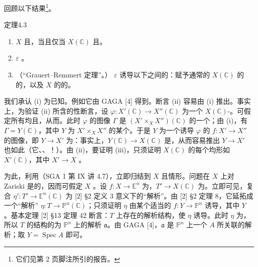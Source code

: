 回顾以下结果\footnote{它们见第 2 页脚注所引的报告。}。
\begin{SGAresult}{定理}{4.3}
\begin{enumerate}
\item[(i)] $X$ 且，当且仅当 $X(\mathbb C)$ 且。
\item[(ii)]  $\varepsilon$ 。
\item[(iii)] （“Grauert--Remmert 定理”。） $\varepsilon$ 诱导以下之间的：赋予通常的 $X(\mathbb C)$ 的的，以及 $X$ 的的。
\end{enumerate}
\end{SGAresult}
我们承认 (i) 为已知。例如它由 GAGA [4] 得到。断言 (ii) 容易由 (i) 推出。事实上，为验证 (ii) 所含的性断言，设 $\varphi:X'(\mathbb C)\to X''(\mathbb C)$ 为一个 $X(\mathbb C)$-。可假定所有均且，从而。此时 $\varphi$ 的图像 $\Gamma$ 是 $(X'\times_X X'')(\mathbb C)$ 的一个；由 (i)，有 $\Gamma=Y(\mathbb C)$，其中 $Y$ 为 $X'\times_X X''$ 的某个。于是 $Y$ 为一个诱导 $\varphi$ 的 $f:X'\to X''$ 的图像，即 $Y\to X'$ 为：事实上，$Y(\mathbb C)\to X(\mathbb C)$ 是，从而容易推出 $Y\to X'$ 也如此（它、、！）。由 (ii)，要证明 (iii)，只须证明 $X(\mathbb C)$ 的每个均形如 $X'(\mathbb C)$，其中 $X'\to X$ 。

为此，利用（SGA 1 第 IX 讲 4.7），立即归结到 $X$ 且情形。问题在 $X$ 上对 Zariski 是的，因而可假定 $X$ 。设 $f:X\to\mathbb E^n$ 为，$T'\to X(\mathbb C)$ 为。立即可见，复合 $\eta':T'\to\mathbb E^n(\mathbb C)$ 为 [2] §2 定义 3 意义下的“解析”。由 [2] §2 定理 8，它延拓成一个“解析” $\eta:T\to\mathbb P^n(\mathbb C)$；只须证明 $\eta$ 由某个适当的 $f:Y\to\mathbb P^n$ 诱导，其中 $Y$ 。基本定理 [2] §13 定理 42 断言：$T$ 上存在的解析结构，使 $\eta$ 诱导。此时 $\eta$ 为，所以 $T$ 的结构的为 $\mathbb P^n$ 上的解析 $\mathfrak a$。由 GAGA [4]，$\mathfrak a$ 是 $\mathbb P^n$ 上一个 $A$ 所关联的解析；取 $Y=\operatorname{Spec}A$ 即可。

